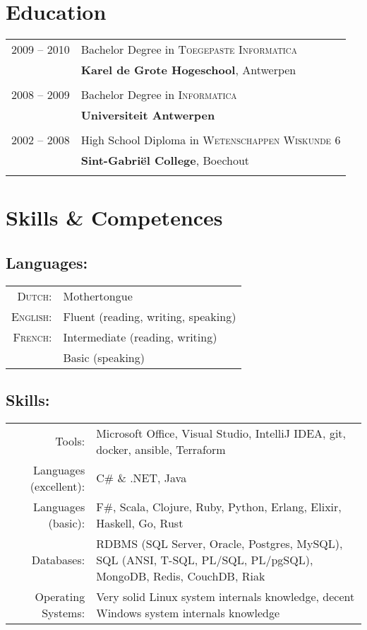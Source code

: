 \documentclass[a4paper,10pt]{article}
\begin{document}
\section{\textcolor{awesome-red}{Edu}cation}
\begin{tabular}{rl}	
2009 – 2010& Bachelor Degree in \textsc{Toegepaste Informatica}\\
&\normalsize\textbf{Karel de Grote Hogeschool}, Antwerpen\\&\\
2008 – 2009& Bachelor Degree in \textsc{Informatica}\\
&\normalsize\textbf{Universiteit Antwerpen}\\&\\
2002 – 2008& High School Diploma in \textsc{Wetenschappen Wiskunde 6}\\
&\normalsize\textbf{Sint-Gabriël College}, Boechout\\&\\
\end{tabular}

\section{\textcolor{awesome-red}{Ski}lls \& Competences}

\subsection{Languages:}
\begin{tabular}{rl}
\textsc{Dutch:}&Mothertongue\\
\textsc{English:}&Fluent (reading, writing, speaking)\\
\textsc{French:}&Intermediate (reading, writing) \\ & Basic (speaking)\\
\end{tabular}

\subsection{Skills:}
\begin{tabular}{rp{11cm}}
Tools:& Microsoft Office, Visual Studio, IntelliJ IDEA, git, docker, ansible, Terraform\\
Languages (excellent):& C\# \& .NET, Java\\
Languages (basic):& F\#, Scala, Clojure, Ruby, Python, Erlang, Elixir, Haskell, Go, Rust\\
Databases:& RDBMS (SQL Server, Oracle, Postgres, MySQL), SQL (ANSI, T-SQL, PL/SQL, PL/pgSQL), MongoDB, Redis, CouchDB, Riak\\
Operating Systems:& Very solid Linux system internals knowledge, decent Windows  system internals knowledge
\end{tabular}
\end{document}
